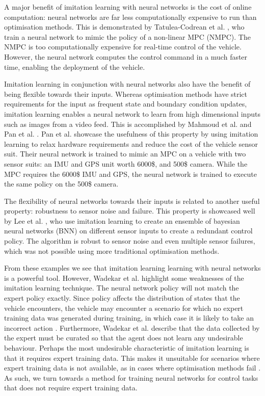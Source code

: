 A major benefit of imitation learning with neural networks is the cost of online computation: neural networks are far less computationally expensive to run than optimisation methods. This is demonstrated by Tatulea-Codrean et al. \cite{Tatulea-Codrean2020}, who train a neural network to mimic the policy of a non-linear MPC (NMPC). The NMPC is too computationally expensive for real-time control of the vehicle. 
However, the neural network computes the control command in a much faster time, enabling the deployment of the vehicle.

Imitation learning in conjunction with neural networks also have the benefit of being flexible towards their inputs. Whereas optimisation methods have strict requirements for the input as frequent state and boundary condition updates, imitation learning enables a neural network to learn from high dimensional inputs such as images from a video feed. This is accomplished by Mahmoud et al. \cite{Mahmoud2020} and Pan et al. \cite{Pan2017a}. 
Pan et al. \cite{Pan2017a} showcase the usefulness of this property by using imitation learning to relax hardware requirements and reduce the cost of the vehicle sensor suit. 
Their neural network is trained to mimic an MPC on a vehicle with two sensor suits: an IMU and GPS unit worth 6000\$, and 500\$ camera.
While the MPC requires the 6000\$ IMU and GPS, the neural network is trained to execute the same policy on the 500\$ camera.

The flexibility of neural networks towards their inputs is related to another useful property: robustness to sensor noise and failure. 
This property is showcased well by Lee et al. \cite{Lee2019}, who use imitation learning to create an ensemble of bayesian neural networks (BNN) on different sensor inputs to create a redundant control policy. 
The algorithm is robust to sensor noise and even multiple sensor failures, which was not possible using more traditional optimisation methods.

From these examples we see that imitation learning learning with neural networks is a powerful tool.
However, Wadekar et al. \cite{Wadekar2021} highlight some weaknesses of the imitation learning technique.
The neural network policy will not match the expert policy exactly. 
Since policy affects the distribution of states that the vehicle encounters, the vehicle may encounter a scenario for which no expert training data was generated during training, in which case it is likely to take an incorrect action \cite{Osa_2018}.
Furthermore, Wadekar et al. \cite{Wadekar2021} describe that the data collected by the expert must be curated so that the agent does not learn any undesirable behaviour.
Perhaps the most undesirable characteristic of imitation learning is that it requires expert training data.
This makes it unsuitable for scenarios where expert training data is not available, as in cases where optimisation methods fail \cite{Fuchs2021a}.
As such, we turn towards a method for training neural networks for control tasks that does not require expert training data.

